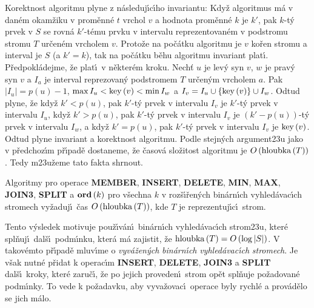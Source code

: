 \flushpar Korektnost algoritmu plyne z n\'asleduj\'\i c\'\i ho invariantu:  
Kdy\v z algoritmus m\'a v dan\'em okam\v ziku v prom\v enn\'e $t$ vrchol $
v$ 
a hodnota prom\v enn\'e $k$ je $k'$, pak $k$-t\'y prvek v $S$ se rovn\'a 
$k'$-t\'emu prvku v intervalu reprezentovan\'em v podstromu 
stromu $T$ ur\v cen\'em vrcholem $v$.  Proto\v ze na po\v c\'atku algoritmu 
je $v$ ko\v ren stromu a interval je $S$ (a $k'=k$), tak na po\v c\'atku 
b\v ehu algoritmu invariant plat\'\i.  P\v redpokl\'adejme, \v ze plat\'\i\ v 
n\v ekter\'em kroku.  Nech\v t $u$ je lev\'y syn $v$, $w$ je prav\'y syn $
v$ a 
$I_a$ je interval reprezovan\'y podstromem $T$ ur\v cen\'ym vrcholem $
a$.  
Pak $|I_u|=p\left(u\right)-1$, $\max I_u<\operatorname{key}\left(v\right)<\min I_w$ a 
$I_v=I_u\cup \left\{\operatorname{key}\left(v\right)\right\}\cup I_w$.  Odtud plyne, \v ze kdy\v z $k'
<p\left(u\right)$, pak 
$k'$-t\'y prvek v intervalu $I_v$ je $k'$-t\'y prvek v intervalu $
I_u$, kdy\v z 
$k'>p\left(u\right)$, pak $k'$-t\'y prvek v intervalu $I_v$ je $\left(k'-p\left(u\right)\right)$-t\'y prvek 
v intervalu $I_w$, a kdy\v z $k'=p\left(u\right)$, pak $k'$-t\'y prvek v intervalu $
I_v$ 
je $\operatorname{key}\left(v\right)$.  Odtud plyne invariant a korektnost algoritmu.  
Podle stejn\'ych argument\accent23u jako v p\v redchoz\'\i m p\v r\'\i pad\v e 
dostaneme, \v ze \v casov\'a slo\v zitost algoritmu je $O\left(\operatorname{hloubka}
\left(T\right)\right)$.  
Tedy m\accent23u\v zeme tato fakta shrnout.  

Algoritmy pro operace {\bf MEMBER}, {\bf INSERT}, {\bf DE\-LE\-TE}, {\bf MIN}, {\bf MAX}, 
{\bf JOIN3}, {\bf SPLIT} a $\bold o\bold r\bold d\left(k\right)$ pro v\v sechna $
k$ v roz\v s\'\i\v ren\'ych bin\'ar\-n\'\i ch 
vy\-hled\'avac\'\i ch stromech vy\v zaduj\'\i\ \v cas $O\left(\operatorname{hloubka}
\left(T\right)\right)$, kde $T$ je 
reprezentuj\'\i c\'\i\ strom. 
\endproclaim


\flushpar Tento v\'ysledek motivuje pou\v z\'\i v\'an\'\i\ bin\'arn\'\i ch 
vyhled\'avac\'\i ch strom\accent23u, kter\'e spl\v nuj\'\i\ dal\v s\'\i\ 
podm\'\i nku, kter\'a m\'a zajistit, \v ze 
$\operatorname{hloubka}\left(T\right)=O\left(\log|S|\right)$.  V takov\'emto p\v r\'\i pad\v e mluv\'\i me o 
\emph{vyv\'a\v zen\'ych} \emph{bin\'arn\'\i ch} 
\emph{vyhled\'avac\'\i ch} \emph{stromech}.  Je v\v sak nutn\'e 
p\v ridat k ope\-rac\'\i m {\bf INSERT}, {\bf DELETE}, {\bf JOIN3} a {\bf SPLIT} dal\v s\'\i\ 
kroky, kter\'e 
zaru\v c\'\i , \v ze po jejich proveden\'\i\ strom op\v et spl\v nuje 
po\v zadovan\'e podm\'\i nky.  To vede k po\v zadavku, aby 
vyva\v zovac\'\i\ operace byly rychl\'e a prov\'ad\v elo se jich m\'alo.  
\medskip

